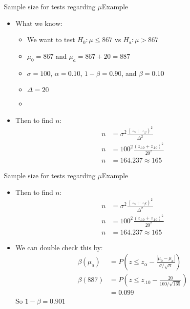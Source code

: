 \documentclass[xcolor=dvipsnames]{beamer}
\begin{document}
\begin{frame}{Sample size for tests regarding $\mu$}{Example}
	\begin{itemize}
		\item What we know:
		\begin{itemize}
			\item We want to test $H_0: \mu \leq 867$ vs $H_a: \mu > 867$
			\item $\mu_0 = 867$ and $\mu_a = 867+20=887$
			\item $\sigma = 100$, $\alpha = 0.10$, $1-\beta = 0.90$, and $\beta = 0.10$
			\item $\Delta = 20$
			\item[]
		\end{itemize}
		\item Then to find $n$:
		\begin{align*}
			n &= \sigma^2\frac{(z_{\alpha} + z_{\beta})^2}{\Delta^2} \\
			n &= 100^2\frac{(z_{.10} + z_{.10})^2}{20^2} \\
			n &= 164.237 \approx 165
		\end{align*}
	\end{itemize}
\end{frame}

\begin{frame}{Sample size for tests regarding $\mu$}{Example}
	\begin{itemize}
		\item Then to find $n$:
		\begin{align*}
		n &= \sigma^2\frac{(z_{\alpha} + z_{\beta})^2}{\Delta^2} \\
		n &= 100^2\frac{(z_{.10} + z_{.10})^2}{20^2} \\
		n &= 164.237 \approx 165
		\end{align*}
		\item We can double check this by:
		\begin{align*}
			\beta(\mu_a) &= P\left(z \leq z_{\alpha} - \frac{|\mu_0 - \mu_a|}{\sigma / \sqrt{n}} \right) \\
			\beta(887) &= P\left(z \leq z_{.10} - \frac{20}{100 / \sqrt{165}} \right) \\
			&= 0.099
		\end{align*}
		So $1-\beta = 0.901$
	\end{itemize}
\end{frame}
\end{document}
